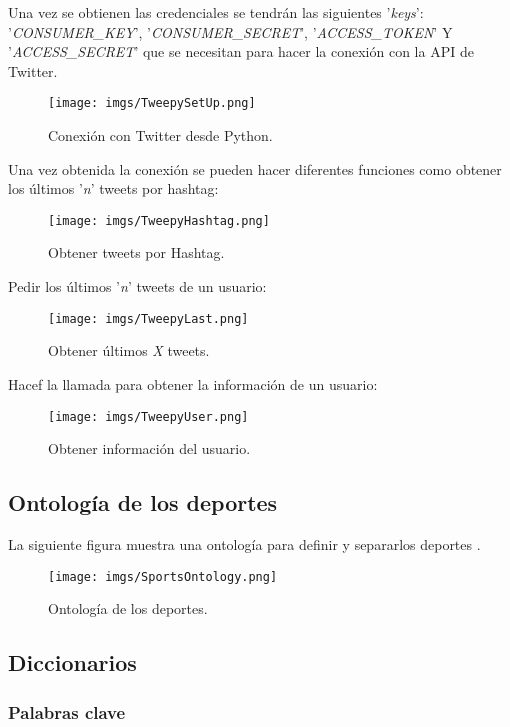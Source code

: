 \documentclass[../all.tex]{subfiles}
\begin{document}
	Una vez se obtienen las credenciales se tendrán las siguientes '\textit{keys}': '\textit{CONSUMER\_KEY}', '\textit{CONSUMER\_SECRET}', '\textit{ACCESS\_TOKEN}' Y '\textit{ACCESS\_SECRET}' que se necesitan para hacer la conexión con la API de Twitter.\\
	\begin{figure}[H]
		\centering
		\texttt{[image: imgs/TweepySetUp.png]}
		\caption{Conexión con Twitter desde Python.}
	\end{figure}
	Una vez obtenida la conexión se pueden hacer diferentes funciones como obtener los últimos '\textit{n}' tweets por hashtag:\\
	\begin{figure}[H]
		\centering
		\texttt{[image: imgs/TweepyHashtag.png]}
		\caption{Obtener tweets por Hashtag.}
	\end{figure}
\newpage
	Pedir los últimos '\textit{n}' tweets de un usuario:\\
	\begin{figure}[H]
		\centering
		\texttt{[image: imgs/TweepyLast.png]}
		\caption{Obtener últimos \textit{X} tweets.}
	\end{figure}
	Hacef la llamada para obtener la información de un usuario:\\
	\begin{figure}[H]
		\centering
		\texttt{[image: imgs/TweepyUser.png]}
		\caption{Obtener información del usuario.}
	\end{figure}


\newpage
\subsection{Ontología de los deportes}
	La siguiente figura muestra una ontología para definir y separarlos deportes \cite{Ontologia}.
	\begin{figure}[H]
		\centering
		\texttt{[image: imgs/SportsOntology.png]}
		\caption{Ontología de los deportes.}
	\end{figure}

\newpage
\subsection{Diccionarios}
\subsubsection{Palabras clave}
\end{document}
